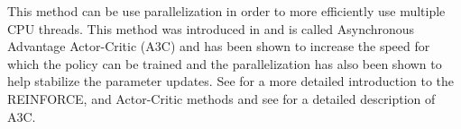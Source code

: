 \documentclass[12pt]{article}
\begin{document}
This method can be use parallelization in order to more efficiently use multiple CPU threads. This method was introduced in
\citet{2016_Mnih} and is called Asynchronous Advantage Actor-Critic (A3C) and has been shown to increase the speed for which the policy can be trained and the parallelization has also been shown to help stabilize the parameter updates. See \citep{1998_Sutton} for a more detailed introduction to the REINFORCE, and Actor-Critic methods and see \citep{2016_Mnih} for a detailed description of A3C.



\end{document}
